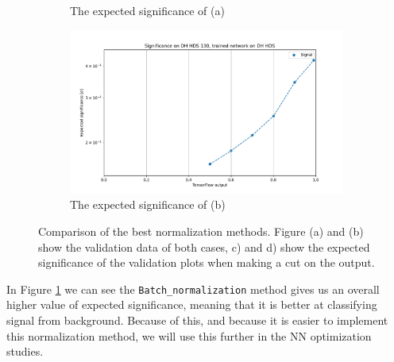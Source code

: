 \documentclass[12pt, a4paper]{book}
\begin{document}
\begin{figure}[!ht]
\begin{subfigure}[b]{0.49\textwidth}
      \caption{The expected significance of (a)}
   \end{subfigure}
   \hfill
   \begin{subfigure}[b]{0.49\textwidth}
      \centering
      \includegraphics[width=1\textwidth]{BatchNorm/EXP_SIG.pdf}
      \caption{The expected significance of (b)}
   \end{subfigure}
   \caption[Comparison of best NN normalization methods and expected significance calculation]{Comparison of the best normalization methods. Figure (a) and (b) show the validation data of both cases, c) and d) show the expected significance of the validation plots when making a cut on the output. }\label{fig:BestNormie}
\end{figure}
\noindent In Figure \ref{fig:BestNormie} we can see the \verb|Batch_normalization| method gives us an overall higher value of expected significance, meaning that it is better at classifying signal from background. 
Because of this, and because it is easier to implement this normalization method, we will use this further in the NN optimization studies. 
\clearpage
\end{document}

